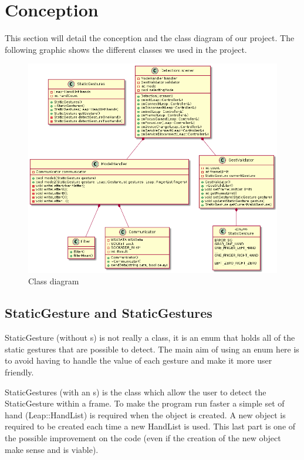 \section{Conception}

This section will detail the conception and the class diagram of our project. The following graphic shows the different classes we used in the project.

\begin{figure}[H]
 \centering
 \includegraphics[scale=0.5]{../uml/classDiagram.png}
 \caption{Class diagram}
\end{figure}

\subsection{StaticGesture and StaticGestures}

StaticGesture (without s) is not really a class, it is an enum that holds all of the static gestures that are possible to detect. The main aim of using an enum here is to avoid having to handle the value of each gesture and make it more user friendly.

StaticGestures (with an s) is the class which allow the user to detect the StaticGesture within a frame. To make the program run faster a simple set of hand (Leap::HandList) is required when the object is created. A new object is required to be created each time a new HandList is used. This last part is one of the possible improvement on the code (even if the creation of the new object make sense and is viable).

